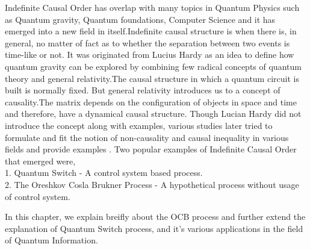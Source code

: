  Indefinite Causal Order has overlap with many topics in Quantum Physics such as Quantum gravity, Quantum foundations, Computer Science and it has emerged into a new field in itself.Indefinite causal structure is when there is, in general, no matter of fact as to whether the separation between two events is time-like or not.
 It was originated from Lucius Hardy as an idea to define how quantum gravity can be explored by combining few radical concepts of quantum theory and general relativity.The causal structure in which a quantum circuit is built is normally fixed. But general relativity introduces us to a concept of causality.The matrix depends on the configuration of objects in space and time and therefore, have a dynamical causal structure. Though Lucian Hardy did not introduce the concept along with examples, various studies later tried to formulate and fit the notion of non-causality and causal inequality in various fields and provide examples \cite{Abbott_2016}\cite{Branciard_2016}\cite{Oreshkov_2016}.
 Two popular examples of Indefinite Causal Order that emerged were,\\
 1. Quantum Switch - A control system based process\cite{chiribella_2009}.\\
 2. The Oreshkov Cosla Brukner Process - A hypothetical process without usage of control system.\cite{OCB_12}

In this chapter, we explain breifly about the OCB process and further extend the explanation of Quantum Switch process, and it's various applications in the field of Quantum Information.
